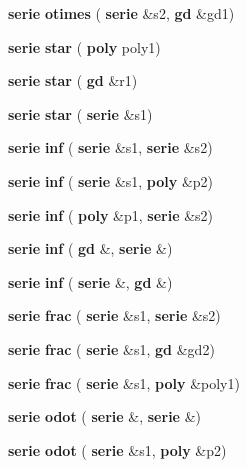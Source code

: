 \begin{DoxyCompactItemize}
\textbf{ serie} {\bfseries otimes} (\textbf{ serie} \&s2, \textbf{ gd} \&gd1)
\item 
\mbox{\label{classmmgd_1_1mmgd_1_1serie_ab39087f51b76a3f107d9a9470e53a588}} 
\textbf{ serie} {\bfseries star} (\textbf{ poly} poly1)
\item 
\mbox{\label{classmmgd_1_1mmgd_1_1serie_a373238aae64f359f9dd07639e18f2450}} 
\textbf{ serie} {\bfseries star} (\textbf{ gd} \&r1)
\item 
\mbox{\label{classmmgd_1_1mmgd_1_1serie_ad896bd7caaabe6801478307c7d792f65}} 
\textbf{ serie} {\bfseries star} (\textbf{ serie} \&s1)
\item 
\mbox{\label{classmmgd_1_1mmgd_1_1serie_a2d481e6996673bb393e494e9597f9149}} 
\textbf{ serie} {\bfseries inf} (\textbf{ serie} \&s1, \textbf{ serie} \&s2)
\item 
\mbox{\label{classmmgd_1_1mmgd_1_1serie_ae529c9c97ff0829cde0be6b234952d67}} 
\textbf{ serie} {\bfseries inf} (\textbf{ serie} \&s1, \textbf{ poly} \&p2)
\item 
\mbox{\label{classmmgd_1_1mmgd_1_1serie_a6da306502d5cbecbda9e28e464beb459}} 
\textbf{ serie} {\bfseries inf} (\textbf{ poly} \&p1, \textbf{ serie} \&s2)
\item 
\mbox{\label{classmmgd_1_1mmgd_1_1serie_a02bcc7dd146114b8b79a0e6864cc7ad4}} 
\textbf{ serie} {\bfseries inf} (\textbf{ gd} \&, \textbf{ serie} \&)
\item 
\mbox{\label{classmmgd_1_1mmgd_1_1serie_ae5191750772678d2a419a573059e4514}} 
\textbf{ serie} {\bfseries inf} (\textbf{ serie} \&, \textbf{ gd} \&)
\item 
\mbox{\label{classmmgd_1_1mmgd_1_1serie_a003b5ee69741b8c166467d26f6574c25}} 
\textbf{ serie} {\bfseries frac} (\textbf{ serie} \&s1, \textbf{ serie} \&s2)
\item 
\mbox{\label{classmmgd_1_1mmgd_1_1serie_a225fb5e2b9dd1f597226271a090a4298}} 
\textbf{ serie} {\bfseries frac} (\textbf{ serie} \&s1, \textbf{ gd} \&gd2)
\item 
\mbox{\label{classmmgd_1_1mmgd_1_1serie_a1ada807b04afe2bc3299b5e3ffa3f506}} 
\textbf{ serie} {\bfseries frac} (\textbf{ serie} \&s1, \textbf{ poly} \&poly1)
\item 
\mbox{\label{classmmgd_1_1mmgd_1_1serie_a96a942e6263b0d9e099db5db3a6c0d9b}} 
\textbf{ serie} {\bfseries odot} (\textbf{ serie} \&, \textbf{ serie} \&)
\item 
\mbox{\label{classmmgd_1_1mmgd_1_1serie_ac5d2d6f470449131209b2ecae26749fa}} 
\textbf{ serie} {\bfseries odot} (\textbf{ serie} \&s1, \textbf{ poly} \&p2)

\end{DoxyCompactItemize}
